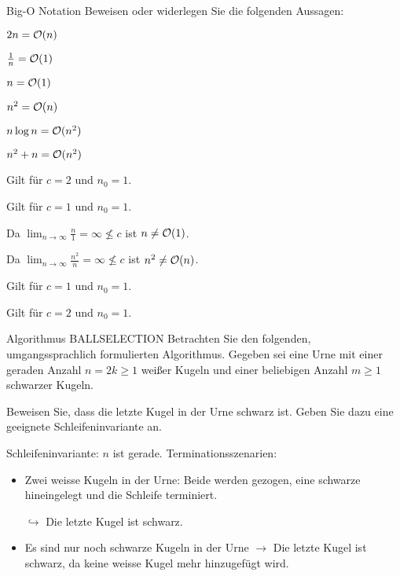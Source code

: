 \documentclass{article}
\begin{document}
\begin{eexercises}{Big-O Notation}{
    Beweisen oder widerlegen Sie die folgenden Aussagen:}
  \item $2n = \mathcal{O}(n)$
  \item $\frac{1}{n} = \mathcal{O}(1)$
  \item $n = \mathcal{O}(1)$
  \item $n^2 = \mathcal{O}(n)$
  \item $n \log n = \mathcal{O}(n^2)$
  \item $n^2 + n = \mathcal{O}(n^2)$
\end{eexercises}

\begin{solutions}
  \item Gilt für $c = 2$ und $n_0 = 1$.
  \item Gilt für $c = 1$ und $n_0 = 1$.
  \item Da $\lim_{n\to\infty} \frac{n}{1} = \infty \not\le c$ ist $n \neq \mathcal{O}(1)$.
  \item Da $\lim_{n\to\infty} \frac{n^2}{n} = \infty \not\le c$ ist $n^2 \neq \mathcal{O}(n)$.
  \item Gilt für $c = 1$ und $n_0 = 1$.
  \item Gilt für $c = 2$ und $n_0 = 1$.
\end{solutions}

\begin{exercise}{Algorithmus BALLSELECTION}
  Betrachten Sie den folgenden, umgangssprachlich formulierten Algorithmus. Gegeben sei eine Urne mit einer geraden Anzahl $n = 2k \ge 1$ weißer Kugeln und einer beliebigen Anzahl $m \geq 1$ schwarzer Kugeln.\par
  \begin{algorithm}[ht]
    \caption{BALLSELECTION}
  \end{algorithm}
  \noindent Beweisen Sie, dass die letzte Kugel in der Urne schwarz ist. Geben Sie dazu eine geeignete Schleifeninvariante an.

  \begin{solution}
    Schleifeninvariante: $n$ ist gerade. Terminationsszenarien:
    \begin{itemize}
      \item Zwei weisse Kugeln in der Urne: Beide werden gezogen, eine schwarze hineingelegt und die Schleife terminiert.\par $\hookrightarrow$ Die letzte Kugel ist schwarz.
      \item Es sind nur noch schwarze Kugeln in der Urne $\to$ Die letzte Kugel ist schwarz, da keine weisse Kugel mehr hinzugefügt wird.
    \end{itemize}
  \end{solution}
\end{exercise}
\end{document}
